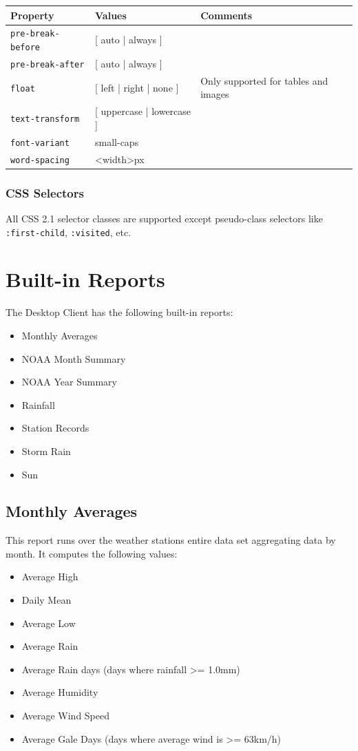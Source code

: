 \documentclass[a4paper,10pt]{book}
\begin{document}
\begin{tabular}{p{3.1cm} p{6cm} p{4.5cm}}
\hline
\textbf{Property} & \textbf{Values} & \textbf{Comments} \\
\hline

\verb|pre-break-before| & [ auto | always ] & \\
\verb|pre-break-after| & [ auto | always ] & \\
\verb|float| & [ left | right | none ] & Only supported for tables and images \\
\verb|text-transform| & [ uppercase | lowercase ] & \\
\verb|font-variant| & small-caps & \\
\verb|word-spacing| & <width>px & \\
\hline
\end{tabular}

\subsection{CSS Selectors}
All CSS 2.1 selector classes are supported except pseudo-class selectors like \verb|:first-child|, \verb|:visited|, etc.



\chapter{Built-in Reports}
\label{app_built_in_reports}
The Desktop Client has the following built-in reports:
\begin{itemize}
\item Monthly Averages
\item NOAA Month Summary
\item NOAA Year Summary
\item Rainfall
\item Station Records
\item Storm Rain
\item Sun
\end{itemize}

\section{Monthly Averages}
This report runs over the weather stations entire data set aggregating data by month. It computes the following values:
\begin{itemize}
\item Average High
\item Daily Mean
\item Average Low
\item Average Rain
\item Average Rain days (days where rainfall >= 1.0mm)
\item Average Humidity
\item Average Wind Speed
\item Average Gale Days (days where average wind is >= 63km/h)
\end{itemize}
\end{document}
